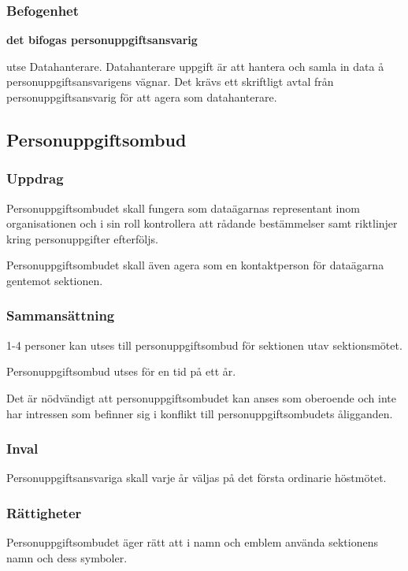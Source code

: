 \subsubsection{Befogenhet}
\textbf{det bifogas personuppgiftsansvarig}
\begin{att}
    \item utse Datahanterare. Datahanterare uppgift är att hantera och samla in data å personuppgiftsansvarigens vägnar. Det krävs ett skriftligt avtal från personuppgiftsansvarig för att agera som datahanterare.
\end{att}

\subsection{Personuppgiftsombud}

\subsubsection{Uppdrag}
 Personuppgiftsombudet skall fungera som dataägarnas representant inom organisationen och i sin roll kontrollera att rådande bestämmelser samt riktlinjer kring personuppgifter efterföljs.
 
 Personuppgiftsombudet skall även agera som en kontaktperson för dataägarna gentemot sektionen.

\subsubsection{Sammansättning}
1-4 personer kan utses till personuppgiftsombud för sektionen utav sektionsmötet.

Personuppgiftsombud utses för en tid på ett år.

Det är nödvändigt att personuppgiftsombudet kan anses som oberoende och inte har intressen som befinner sig i konflikt till personuppgiftsombudets åligganden.

\subsubsection{Inval}
Personuppgiftsansvariga skall varje år väljas på det första ordinarie höstmötet.

\subsubsection{Rättigheter}
Personuppgiftsombudet äger rätt att i namn och emblem använda sektionens namn
och dess symboler.

